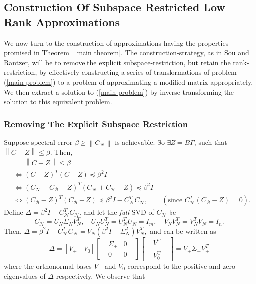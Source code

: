 \documentclass[11pt]{article}
\newcommand{\norm}[1]{\left\|#1\right\|}
\newcommand{\Leq}{\preceq}
\newcommand{\B}{\mathcal{B}}
\newcommand{\N}{\mathcal{N}}
\newcommand{\G}{\Gamma}
\newcommand{\0}{\ensuremath{\mathbf{0}}}
\renewcommand{\>}{\succ}
\newcommand{\<}{\prec}
\renewcommand{\iff}{\ensuremath{\Leftrightarrow}}
\begin{document}
\subsection{Construction Of Subspace Restricted Low Rank Approximations}
We now turn to the construction of approximations having the properties promised in Theorem~ \ref{main theorem}. The construction-strategy, as in Sou and Rantzer, will be to remove the explicit subspace-restriction, but retain the rank-restriction, by effectively constructing a series of transformations of problem (\ref{main problem}) to a problem of approximating a modified matrix appropriately. We then extract a solution to (\ref{main problem}) by inverse-transforming the solution to this equivalent problem.

\subsubsection{Removing The Explicit Subspace Restriction}
Suppose spectral error $\beta \geq \norm{C_{\N}}$ is achievable. So
 $\exists Z = B \G$, such that $\norm{C - Z} \leq \beta$. Then,
\begin{align*}
&\phantom{\iff}\norm{C - Z} \leq \beta \\[3pt]
& \iff \left( {C} - {Z} \right)^T \left( {C} - {Z} \right) 
\Leq \beta^2 I \\
& \iff \left( {C}_{\N} + {C}_{\B} - {Z} \right)^T \left( {C}_{\N} + {C}_{\B} - {Z} \right) \Leq \beta^2 I \\
& \iff \left( {C}_{\B} - {Z} \right)^T \left( {C}_{\B} - {Z} \right) \Leq \beta^2 I - {C}_{\N} ^T {C}_{\N}, \qquad (\text{since }  {C}_{\N}^T({C}_{\B} - {Z})=0).
\end{align*}
Define 
$\Delta = \beta^2 I - {C}_{\N} ^T {C}_{\N}$, and let the \emph{full} SVD of $C_{\N}$ be 
\[ C_{\N} = U_N\Sigma_NV_N^T, \quad U_N U_N^T=U_N^TU_N=I_m, \quad V_NV_N^T = V_N^TV_N = I_n. \]
Then, $\Delta = \beta^2 I - {C}_{\N} ^T {C}_{\N} = V_N(\beta^2I - \Sigma_N^2)V_N^T,$ and can be written as
\[ \Delta =  [  V_+ \quad V_0  ]
\begin{bmatrix}
&\Sigma_+ & 0 &\\
&0 & 0&
\end{bmatrix}
\begin{bmatrix}
&V_+^{\text{T}}&\\
&V_0^{\text{T}}&
\end{bmatrix} = V_+ \Sigma_+ V_+^T \]
where the orthonormal bases $V_+$ and $V_0$ correspond to the positive and zero eigenvalues of $\Delta$ respectively. We observe that
\end{document}
